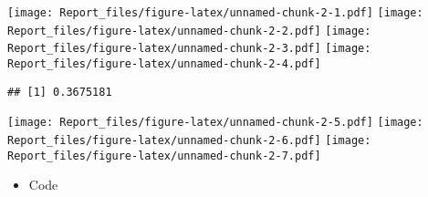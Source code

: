 \documentclass[
]{article}
\providecommand{\tightlist}{%
  \setlength{\itemsep}{0pt}\setlength{\parskip}{0pt}}
\begin{document}
\texttt{[image: Report\_files/figure-latex/unnamed-chunk-2-1.pdf]}
\texttt{[image: Report\_files/figure-latex/unnamed-chunk-2-2.pdf]}
\texttt{[image: Report\_files/figure-latex/unnamed-chunk-2-3.pdf]}
\texttt{[image: Report\_files/figure-latex/unnamed-chunk-2-4.pdf]}

\begin{verbatim}
## [1] 0.3675181
\end{verbatim}

\texttt{[image: Report\_files/figure-latex/unnamed-chunk-2-5.pdf]}
\texttt{[image: Report\_files/figure-latex/unnamed-chunk-2-6.pdf]}
\texttt{[image: Report\_files/figure-latex/unnamed-chunk-2-7.pdf]}

\begin{itemize}
\tightlist
\item
  Code
\end{itemize}
\end{document}
